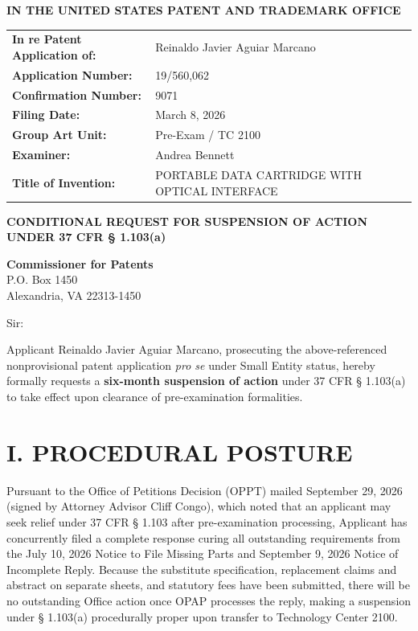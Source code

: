\documentclass[11pt,letterpaper]{article}
\begin{document}
\thispagestyle{empty}

\begin{center}
    \large\textbf{IN THE UNITED STATES PATENT AND TRADEMARK OFFICE} \\
\end{center}

\vspace{0.2cm}
\noindent\begin{tabular}{p{2.3in}p{4.0in}}
\textbf{In re Patent Application of:} & Reinaldo Javier Aguiar Marcano \\
\textbf{Application Number:} & 19/560,062 \\
\textbf{Confirmation Number:} & 9071 \\
\textbf{Filing Date:} & March 8, 2026 \\
\textbf{Group Art Unit:} & Pre-Exam / TC 2100 \\
\textbf{Examiner:} & Andrea Bennett \\
\textbf{Title of Invention:} & PORTABLE DATA CARTRIDGE WITH OPTICAL INTERFACE \\
\end{tabular}

\vspace{0.4cm}
\begin{center}
    \textbf{\large CONDITIONAL REQUEST FOR SUSPENSION OF ACTION \\
    UNDER 37 CFR \S{} 1.103(a)}
\end{center}

\vspace{0.2cm}
\noindent\textbf{Commissioner for Patents} \\
\noindent P.O. Box 1450 \\
\noindent Alexandria, VA 22313-1450

\vspace{0.2cm}
\noindent Sir:

Applicant Reinaldo Javier Aguiar Marcano, prosecuting the above-referenced nonprovisional patent application \textit{pro se} under Small Entity status, hereby formally requests a \textbf{six-month suspension of action} under 37 CFR \S{} 1.103(a) to take effect upon clearance of pre-examination formalities.

\section*{I. PROCEDURAL POSTURE}

Pursuant to the Office of Petitions Decision (OPPT) mailed September 29, 2026 (signed by Attorney Advisor Cliff Congo), which noted that an applicant may seek relief under 37 CFR \S{} 1.103 after pre-examination processing, Applicant has concurrently filed a complete response curing all outstanding requirements from the July 10, 2026 Notice to File Missing Parts and September 9, 2026 Notice of Incomplete Reply. Because the substitute specification, replacement claims and abstract on separate sheets, and statutory fees have been submitted, there will be no outstanding Office action once OPAP processes the reply, making a suspension under \S{} 1.103(a) procedurally proper upon transfer to Technology Center 2100.
\end{document}
